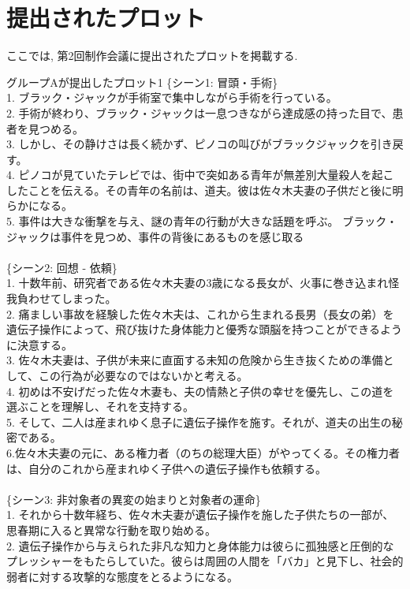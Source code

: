 \documentclass[a4j,12pt]{jsreport}
\begin{document}
\chapter{提出されたプロット}\label{app:plot}
ここでは, 第2回制作会議に提出されたプロットを掲載する.

\vspace{10pt}
\begin{breakitembox}
   [l]{グループAが提出したプロット1}
   \noindent \{シーン1: 冒頭・手術\}\\
1. ブラック・ジャックが手術室で集中しながら手術を行っている。\\
2. 手術が終わり、ブラック・ジャックは一息つきながら達成感の持った目で、患者を見つめる。\\
3. しかし、その静けさは長く続かず、ピノコの叫びがブラックジャックを引き戻す。\\
4. ピノコが見ていたテレビでは、街中で突如ある青年が無差別大量殺人を起こしたことを伝える。その青年の名前は、道夫。彼は佐々木夫妻の子供だと後に明らかになる。\\
5. 事件は大きな衝撃を与え、謎の青年の行動が大きな話題を呼ぶ。 ブラック・ジャックは事件を見つめ、事件の背後にあるものを感じ取る\\
\\
 \{シーン2: 回想 - 依頼\}\\
1. 十数年前、研究者である佐々木夫妻の3歳になる長女が、火事に巻き込まれ怪我負わせてしまった。\\
2. 痛ましい事故を経験した佐々木夫は、これから生まれる長男（長女の弟）を遺伝子操作によって、飛び抜けた身体能力と優秀な頭脳を持つことができるように決意する。\\
3. 佐々木夫妻は、子供が未来に直面する未知の危険から生き抜くための準備として、この行為が必要なのではないかと考える。\\
4. 初めは不安げだった佐々木妻も、夫の情熱と子供の幸せを優先し、この道を選ぶことを理解し、それを支持する。\\
5. そして、二人は産まれゆく息子に遺伝子操作を施す。それが、道夫の出生の秘密である。\\
6.佐々木夫妻の元に、ある権力者（のちの総理大臣）がやってくる。その権力者は、自分のこれから産まれゆく子供への遺伝子操作も依頼する。\\
\\
 \{シーン3: 非対象者の異変の始まりと対象者の運命\}\\
1. それから十数年経ち、佐々木夫妻が遺伝子操作を施した子供たちの一部が、思春期に入ると異常な行動を取り始める。\\
2. 遺伝子操作から与えられた非凡な知力と身体能力は彼らに孤独感と圧倒的なプレッシャーをもたらしていた。彼らは周囲の人間を「バカ」と見下し、社会的弱者に対する攻撃的な態度をとるようになる。\\

\end{breakitembox}
\end{document}
